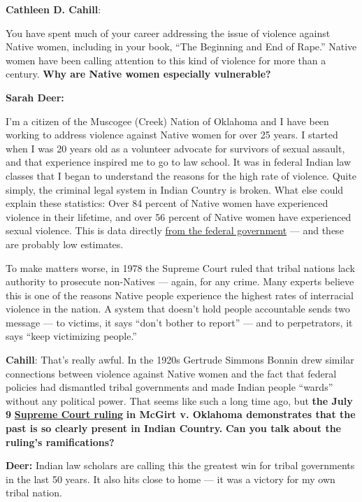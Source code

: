 \textbf{Cathleen D. Cahill}:

You have spent much of your career addressing the issue of violence
against Native women, including in your book, ``The Beginning and End of
Rape.'' Native women have been calling attention to this kind of
violence for more than a century. \textbf{Why are Native women
especially vulnerable?}

\textbf{Sarah Deer:}

I'm a citizen of the Muscogee (Creek) Nation of Oklahoma and I have been
working to address violence against Native women for over 25 years. I
started when I was 20 years old as a volunteer advocate for survivors of
sexual assault, and that experience inspired me to go to law school. It
was in federal Indian law classes that I began to understand the reasons
for the high rate of violence. Quite simply, the criminal legal system
in Indian Country is broken. What else could explain these statistics:
Over 84 percent of Native women have experienced violence in their
lifetime, and over 56 percent of Native women have experienced sexual
violence. This is data directly
\href{https://nij.ojp.gov/topics/articles/violence-against-american-indian-and-alaska-native-women-and-men}{from
the federal government} --- and these are probably low estimates.

To make matters worse, in 1978 the Supreme Court ruled that tribal
nations lack authority to prosecute non-Natives --- again, for any
crime. Many experts believe this is one of the reasons Native people
experience the highest rates of interracial violence in the nation. A
system that doesn't hold people accountable sends two message --- to
victims, it says ``don't bother to report'' --- and to perpetrators, it
says ``keep victimizing people.''

\textbf{Cahill}: That's really awful. In the 1920s Gertrude Simmons
Bonnin drew similar connections between violence against Native women
and the fact that federal policies had dismantled tribal governments and
made Indian people ``wards'' without any political power. That seems
like such a long time ago, but \textbf{the July 9}
\textbf{\href{https://www.nytimes3xbfgragh.onion/2020/07/09/us/supreme-court-oklahoma-mcgirt-creek-nation.html}{Supreme
Court ruling}} \textbf{in McGirt v. Oklahoma demonstrates that the past
is so clearly present in Indian Country.} \textbf{Can you talk about the
ruling's ramifications?}

\textbf{Deer:} Indian law scholars are calling this the greatest win for
tribal governments in the last 50 years. It also hits close to home ---
it was a victory for my own tribal nation.

